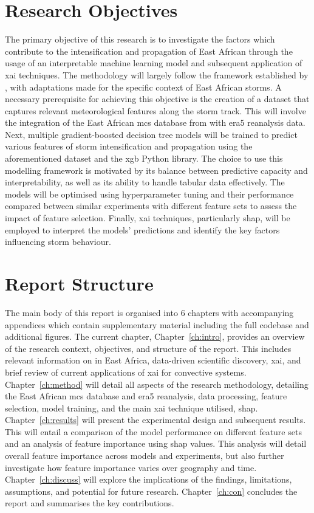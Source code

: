 \section{Research Objectives}

The primary objective of this research is to investigate the factors which contribute to the intensification and propagation of East African  through the usage of an interpretable machine learning model and subsequent application of \acrshort{xai} techniques. The methodology will largely follow the framework established by \cite{Hunt2024}, with adaptations made for the specific context of East African storms. A necessary prerequisite for achieving this objective is the creation of a dataset that captures relevant meteorological features along the storm track. This will involve the integration of the East African \acrshort{mcs} database from \cite{Hill2023} with \acrshort{era5} reanalysis data. Next, multiple gradient-boosted decision tree models will be trained to predict various features of storm intensification and propagation using the aforementioned dataset and the \acrfull{xgb} Python library. The choice to use this modelling framework is motivated by its balance between predictive capacity and interpretability, as well as its ability to handle tabular data effectively. The models will be optimised using hyperparameter tuning and their performance compared between similar experiments with different feature sets to assess the impact of feature selection. Finally, \acrshort{xai} techniques, particularly \acrshort{shap}, will be employed to interpret the models' predictions and identify the key factors influencing storm behaviour.

\section{Report Structure}

The main body of this report is organised into 6 chapters with accompanying appendices which contain supplementary material including the full codebase and additional figures. The current chapter, Chapter~\ref{ch:intro}, provides an overview of the research context, objectives, and structure of the report. This includes relevant information on  in East Africa, data-driven scientific discovery, \acrfull{xai}, and brief review of current applications of \acrshort{xai} for convective systems. Chapter~\ref{ch:method} will detail all aspects of the research methodology, detailing the East African \acrshort{mcs} database and \acrshort{era5} reanalysis, data processing, feature selection, model training, and the main \acrshort{xai} technique utilised, \acrshort{shap}. Chapter~\ref{ch:results} will present the experimental design and subsequent results. This will entail a comparison of the model performance on different feature sets and an analysis of feature importance using \acrshort{shap} values. This analysis will detail overall feature importance across models and experiments, but also further investigate how feature importance varies over geography and time. Chapter~\ref{ch:discuss} will explore the implications of the findings, limitations, assumptions, and potential for future research. Chapter~\ref{ch:con} concludes the report and summarises the key contributions.